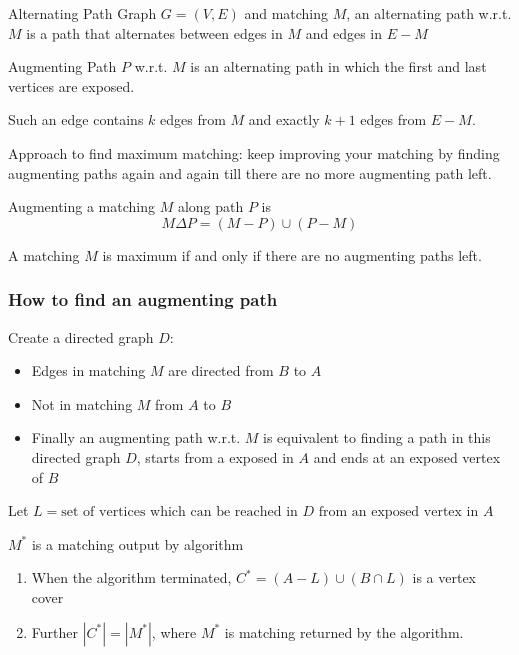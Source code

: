 \begin{definition}{Alternating Path} Graph $G= (V,E)$ and matching $M$, an
    alternating path w.r.t. $M$ is a path that alternates between edges in
    $M$ and edges in $E-M$
\end{definition}

\begin{definition}{Augmenting Path} $P$ w.r.t. $M$ is an alternating path
    in which the first and last vertices are exposed.

    Such an edge contains $k$ edges from $M$ and exactly $k+1$ edges from
    $E-M$.
\end{definition}

Approach to find maximum matching: keep improving your matching by finding
augmenting paths again and again till there are no more augmenting path
left.

Augmenting a matching $M$ along path $P$ is 
\[ M\Delta P = (M-P) \cup (P-M)\]
\begin{thm}A matching $M$ is maximum if and only if there are no
    augmenting paths left.
\end{thm}


\subsubsection{How to find an augmenting path}
Create a directed graph $D$:
\begin{itemize}
    \item Edges in matching $M$ are directed from $B$ to $A$
    \item Not in matching $M$ from $A$ to $B$
    \item Finally an augmenting path w.r.t. $M$ is equivalent to finding a
        path in this directed graph $D$, starts from a exposed in $A$ and
        ends at an exposed vertex of $B$
\end{itemize}

Let $L = \text{set of vertices which can be reached in $D$ from an exposed
vertex in $A$}$

\begin{lem} $M^*$ is a matching output by algorithm
    \begin{enumerate}
        \item When the  algorithm terminated, $C^* = (A-L)\cup (B\cap L)$
            is a vertex cover
        \item Further $|C^*|=|M^*|$, where $M^*$ is matching returned by
            the algorithm.
    \end{enumerate}
\end{lem}
